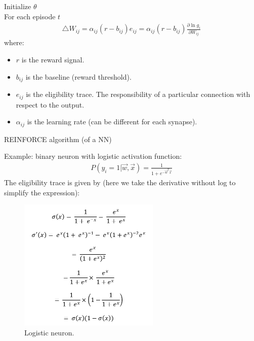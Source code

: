 \documentclass[11pt]{book} %
\begin{document}
\begin{algorithm}[H]
    \SetNoFillComment
    \SetAlgoLined
    Initialize $\theta$ \\
    For each episode $t$ \\
    \begin{align*}
        \bigtriangleup W_{ij} = \alpha_{ij}(r - b_{ij})e_{ij} = \alpha_{ij}(r - b_{ij})\frac{\partial \ln  g_i}{\partial W_{ij}}
    \end{align*}
    where:
    \begin{itemize}
        \item $r$ is the reward signal.
        \item $b_{ij}$ is the baseline (reward threshold).
        \item $e_{ij}$ is the eligibility trace. The responsibility of a particular connection with respect to the output.
        \item $\alpha_{ij}$ is the learning rate (can be different for each synapse).
    \end{itemize}
    \caption{REINFORCE algorithm (of a NN)} \label{REINFORCE algorithm}
\end{algorithm}

\medbreak

Example: binary neuron with logistic activation function:
\begin{align*}
    P(y_i = 1 | \vec{w}, \vec{x}) = \frac{1}{1 + e^{-\vec{w}^T \vec{x}}}
\end{align*}
The eligibility trace is given by (here we take the derivative without log to simplify the expression):
\begin{figure}[ht]
    \centering
    \includegraphics[width=0.6\textwidth]{./Figs/sigmoid_function_derivative.png}
    \caption{Logistic neuron.}
    \label{fig:logistic_neuron}
\end{figure}
\end{document}
